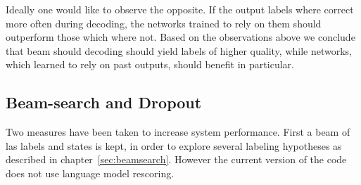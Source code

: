 Ideally one would like to observe the opposite. If the output labels where correct more often during decoding, the networks trained to rely on them should outperform those which where not. Based on the observations above we conclude that beam should decoding should yield labels of higher quality, while networks, which learned to rely on past outputs, should benefit in particular.

\subsection{Beam-search and Dropout}
Two measures have been taken to increase system performance. First a beam of las labels and states is kept, in order to explore several labeling hypotheses as described in chapter~\ref{sec:beamsearch}. However the current version of the code does not use language model rescoring.

